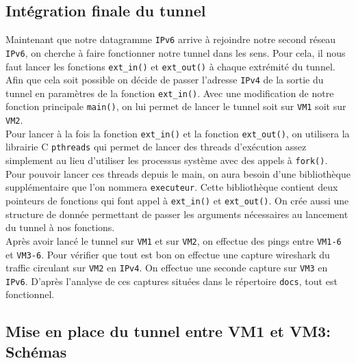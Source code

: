 \documentclass[a4paper, 12pt]{article}
\begin{document}
    \subsection{Intégration finale du tunnel}

    Maintenant que notre datagramme \verb+IPv6+ arrive à rejoindre notre second 
    réseau \verb+IPv6+, on cherche à faire fonctionner notre tunnel dans les 
    sens. Pour cela, il nous faut lancer les fonctions \verb+ext_in()+ et 
    \verb+ext_out()+ à chaque extrémité du tunnel. Afin que cela soit possible
    on décide de passer l'adresse \verb+IPv4+ de la sortie du tunnel en 
    paramètres de la fonction \verb+ext_in()+. Avec une modification de notre 
    fonction principale \verb+main()+, on lui permet de lancer le tunnel soit 
    sur \verb+VM1+ soit sur \verb+VM2+. \\

    Pour lancer à la fois la fonction \verb+ext_in()+ et la fonction 
    \verb+ext_out()+, on utilisera la librairie C \verb+pthreads+ qui permet 
    de lancer des threads d'exécution assez simplement au lieu d'utiliser les
    processus système avec des appels à \verb+fork()+. Pour pouvoir lancer ces
    threads depuis le main, on aura besoin d'une bibliothèque supplémentaire 
    que l'on nommera \verb+executeur+. Cette bibliothèque contient deux 
    pointeurs de fonctions qui font appel à \verb+ext_in()+ et \verb+ext_out()+.
    On crée aussi une structure de donnée permettant de passer les arguments
    nécessaires au lancement du tunnel à nos fonctions. \\

    Après avoir lancé le tunnel sur \verb+VM1+ et sur \verb+VM2+, on effectue 
    des pings entre \verb+VM1-6+ et \verb+VM3-6+. Pour vérifier que tout est
    bon on effectue une capture wireshark du traffic circulant sur \verb+VM2+
    en \verb+IPv4+. On effectue une seconde capture  sur \verb+VM3+ en 
    \verb+IPv6+. D'après l'analyse de ces captures situées dans le répertoire 
    \verb+docs+, tout est fonctionnel.

    \subsection{Mise en place du tunnel entre VM1 et VM3: Schémas}
\end{document}
